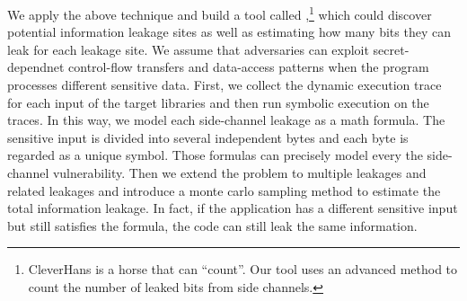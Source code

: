 We apply the above technique and build a tool called \tool{},\footnote{CleverHans is a horse that can ``count''.
Our tool uses an advanced method to count the number of leaked bits from side channels.}
which could discover potential information leakage sites 
as well as estimating how many bits they can leak for each leakage site. 
We assume that adversaries can exploit secret-dependnet control-flow transfers and 
data-access patterns when the program processes different sensitive data. 
First, we collect the dynamic execution trace for each input of the target libraries 
and then run symbolic execution on the traces. 
In this way, we model each side-channel leakage as a math formula. 
The sensitive input is divided into several independent bytes and each byte is regarded as 
a unique symbol. Those formulas can precisely model every the side-channel vulnerability.
Then we extend the problem to multiple leakages and related leakages
and introduce a monte carlo sampling method to estimate the total information leakage.
In fact, if the application has a different sensitive input but still satisfies the formula, 
the code can still leak the same information. 





